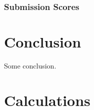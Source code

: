 \documentclass[sigconf, fleqn]{acmart}
\begin{document}
\subsubsection{Submission Scores}


\section{Conclusion}
Some conclusion.


\typeout{}




\clearpage
\appendix
\section{Calculations}
\end{document}
